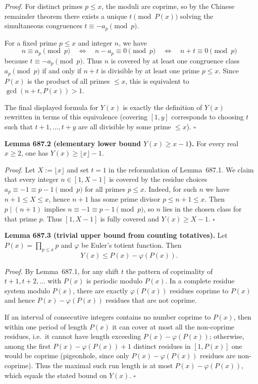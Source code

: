 \emph{Proof.}
For distinct primes $p\le x$, the moduli are coprime, so by the Chinese remainder theorem there exists a unique $t\pmod{P(x)}$
solving the simultaneous congruences $t\equiv -a_p\pmod p$.

For a fixed prime $p\le x$ and integer $n$, we have
\[
n\equiv a_p\pmod p\quad\Longleftrightarrow\quad n-a_p\equiv 0\pmod p
\quad\Longleftrightarrow\quad n+t\equiv 0\pmod p
\]
because $t\equiv -a_p\pmod p$.
Thus $n$ is covered by at least one congruence class $a_p\pmod p$ if and only if $n+t$ is divisible by at least one prime $p\le x$.
Since $P(x)$ is the product of all primes $\le x$, this is equivalent to $\gcd(n+t,P(x))>1$.

The final displayed formula for $Y(x)$ is exactly the definition of $Y(x)$ rewritten in terms of this equivalence (covering $[1,y]$ corresponds
to choosing $t$ such that $t+1,\dots,t+y$ are all divisible by some prime $\le x$). \hfill$\square$

\medskip
\noindent\textbf{Lemma 687.2 (elementary lower bound $Y(x)\ge x-1$).}
For every real $x\ge 2$, one has $Y(x)\ge \lfloor x\rfloor-1$.

\emph{Proof.}
Let $X:=\lfloor x\rfloor$ and set $t=1$ in the reformulation of Lemma~687.1.
We claim that every integer $n\in[1,X-1]$ is covered by the residue choices $a_p\equiv -1\equiv p-1\pmod p$ for all primes $p\le x$.
Indeed, for such $n$ we have $n+1\le X\le x$, hence $n+1$ has some prime divisor $p\le n+1\le x$.
Then $p\mid (n+1)$ implies $n\equiv -1\equiv p-1\pmod p$, so $n$ lies in the chosen class for that prime $p$.
Thus $[1,X-1]$ is fully covered and $Y(x)\ge X-1$. \hfill$\square$

\medskip
\noindent\textbf{Lemma 687.3 (trivial upper bound from counting totatives).}
Let $P(x)=\prod_{p\le x}p$ and $\varphi$ be Euler's totient function. Then
\[
Y(x)\le P(x)-\varphi(P(x)).
\]

\emph{Proof.}
By Lemma~687.1, for any shift $t$ the pattern of coprimality of $t+1,t+2,\dots$ with $P(x)$ is periodic modulo $P(x)$.
In a complete residue system modulo $P(x)$, there are exactly $\varphi(P(x))$ residues coprime to $P(x)$ and hence
$P(x)-\varphi(P(x))$ residues that are not coprime.

If an interval of consecutive integers contains no number coprime to $P(x)$, then within one period of length $P(x)$ it can cover at most
all the non-coprime residues, i.e.\ it cannot have length exceeding $P(x)-\varphi(P(x))$; otherwise, among the first $P(x)-\varphi(P(x))+1$
distinct residues in $[1,P(x)]$ one would be coprime (pigeonhole, since only $P(x)-\varphi(P(x))$ residues are non-coprime).
Thus the maximal such run length is at most $P(x)-\varphi(P(x))$, which equals the stated bound on $Y(x)$. \hfill$\square$

